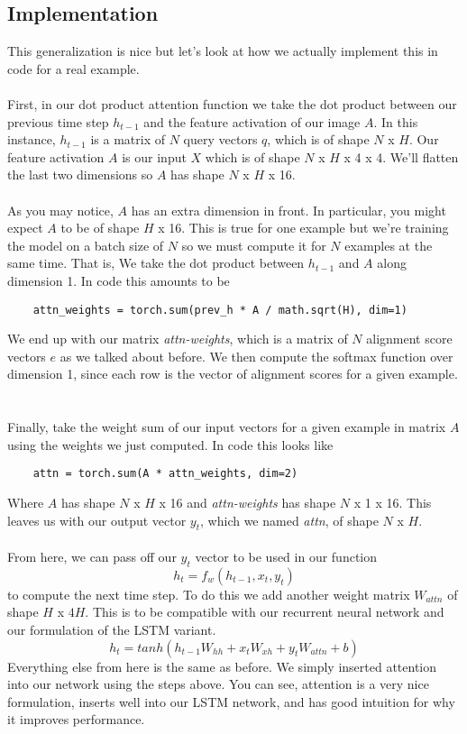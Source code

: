 \documentclass[12pt]{article}
\begin{document}
\subsection{Implementation}
This generalization is nice but let's look at how we actually implement this in code 
for a real example.
~\\
~\\
First, in our dot product attention function we take the dot product between our previous 
time step $h_{t-1}$ and the feature activation of our image $A$. In this instance, 
$h_{t-1}$ is a matrix of $N$ query vectors $q$, which is of shape $N$ x $H$. 
Our feature activation $A$ is our input $X$ which is of shape $N$ x $H$ x 4 x 4. 
We'll flatten the last two dimensions so $A$ has shape $N$ x $H$ x 16. 
~\\
~\\
As you may notice, $A$ has an extra dimension in front. In particular, you might expect 
$A$ to be of shape $H$ x 16. This is true for one example but we're training the model 
on a batch size of $N$ so we must compute it for $N$ examples at the same time. That is, 
We take the dot product between $h_{t-1}$ and $A$ along dimension 1. In code this amounts to 
be 
\begin{verbatim}
    attn_weights = torch.sum(prev_h * A / math.sqrt(H), dim=1)
\end{verbatim}
We end up with our matrix \emph{attn-weights}, which is a matrix of $N$ alignment 
score vectors $e$ as we talked about before. We then compute the softmax function 
over dimension 1, since each row is the vector of alignment scores for a given 
example. 
~\\
~\\
Finally, take the weight sum of our input vectors for a given example in matrix $A$ 
using the weights we just computed. In code this looks like 
\begin{verbatim}
    attn = torch.sum(A * attn_weights, dim=2)
\end{verbatim}
Where $A$ has shape $N$ x $H$ x 16 and \emph{attn-weights} has shape 
$N$ x 1 x 16. This leaves us with our output vector $y_t$, which we named 
\emph{attn}, of shape $N$ x $H$. 
~\\
~\\
From here, we can pass off our $y_t$ vector to be used in our function 
\begin{equation*}
    h_t = f_w (h_{t-1}, x_t, y_t)
\end{equation*}
to compute the next time step. To do this we add another weight matrix 
$W_{attn}$ of shape $H$ x $4H$. This is to be compatible with our recurrent neural 
network and our formulation of the LSTM variant. 
\begin{equation*}
    h_t = tanh(h_{t-1}W_{hh} + x_tW_{xh} + y_tW_{attn} + b)
\end{equation*}
Everything else from here is the same as before. We simply inserted attention 
into our network using the steps above. You can see, attention is a very nice 
formulation, inserts well into our LSTM network, and has good intuition for 
why it improves performance. 
\end{document}
